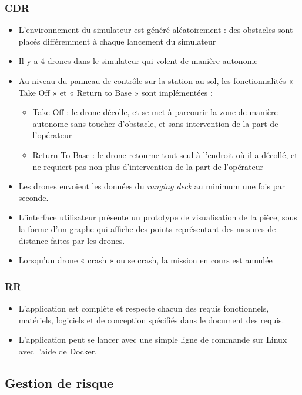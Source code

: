 \documentclass{mistcoursedoc}
\begin{document}
\subsubsection{CDR}
\begin{itemize}
  \item L'environnement du simulateur est généré aléatoirement : des obstacles sont placés différemment à chaque lancement du simulateur
  \item Il y a 4 drones dans le simulateur qui volent de manière autonome
  \item Au niveau du panneau de contrôle sur la station au sol, les fonctionnalités « Take Off » et « Return to Base » sont implémentées :
        \begin{itemize}
          \item Take Off : le drone décolle, et se met à parcourir la zone de manière autonome sans toucher d'obstacle, et sans intervention de la part de l'opérateur
          \item Return To Base : le drone retourne tout seul à l'endroit où il a décollé, et ne requiert pas non plus d'intervention de la part de l'opérateur
        \end{itemize}

  \item Les drones envoient les données du \textit{ranging deck} au minimum une fois par seconde.
  \item L'interface utilisateur présente un prototype de visualisation de la pièce, sous la forme d'un graphe qui affiche des points représentant des mesures de distance faites par les drones.
  \item Lorsqu'un drone « crash » ou se crash, la mission en cours est annulée
\end{itemize}

\subsubsection{RR}
\begin{itemize}
  \item L'application est complète et respecte chacun des requis fonctionnels, matériels, logiciels et de conception spécifiés dans le document des requis.
  \item L'application peut se lancer avec une simple ligne de commande sur Linux avec l'aide de Docker.
\end{itemize}

\subsection{Gestion de risque}
\end{document}
